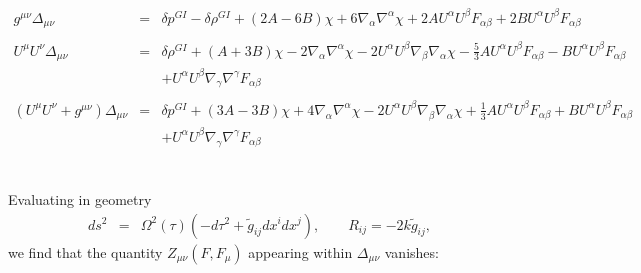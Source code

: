 \documentclass[10pt,letterpaper]{article}
\numberwithin{equation}{section}
\begin{document}
\begin{eqnarray}
\nonumber \\  \\ 
g^{\mu\nu}\Delta_{\mu\nu}&=& \delta p^{GI}{} -  \delta \rho^{GI}{} + (2 A - 6 B) \chi + 6 \nabla_{\alpha }\nabla^{\alpha }\chi +2 A U^{\alpha } U^{\beta } F_{\alpha \beta } + 2 B U^{\alpha } U^{\beta } F_{\alpha \beta }
\\  \nonumber\\ 
U^\mu U^\nu \Delta_{\mu\nu}&=& \delta \rho^{GI}{} + (A + 3 B) \chi - 2 \nabla_{\alpha }\nabla^{\alpha }\chi - 2 U^{\alpha } U^{\beta } \nabla_{\beta }\nabla_{\alpha }\chi - \tfrac{5}{3} A U^{\alpha } U^{\beta } F_{\alpha \beta } -  B U^{\alpha } U^{\beta } F_{\alpha \beta } \nonumber \\ 
&& + U^{\alpha } U^{\beta } \nabla_{\gamma }\nabla^{\gamma }F_{\alpha \beta }
\\  \nonumber\\ 
(U^\mu U^\nu +g^{\mu\nu})\Delta_{\mu\nu}&=& \delta p^{GI}{} + (3 A - 3 B) \chi + 4 \nabla_{\alpha }\nabla^{\alpha }\chi - 2 U^{\alpha } U^{\beta } \nabla_{\beta }\nabla_{\alpha }\chi +\tfrac{1}{3} A U^{\alpha } U^{\beta } F_{\alpha \beta } + B U^{\alpha } U^{\beta } F_{\alpha \beta } \nonumber \\ 
&& + U^{\alpha } U^{\beta } \nabla_{\gamma }\nabla^{\gamma }F_{\alpha \beta }
\end{eqnarray}
\\ \\
Evaluating in geometry 
\begin{eqnarray}
ds^2 &=& \Omega^2(\tau)\left(-d\tau^2 +\tilde g_{ij} dx^i dx^j\right),\qquad R_{ij} = -2k \tilde g_{ij}
\label{geom2},
\end{eqnarray}
we find that the quantity $Z_{\mu\nu}(F,F_\mu)$ appearing within $\Delta_{\mu\nu}$ vanishes:
\end{document}
